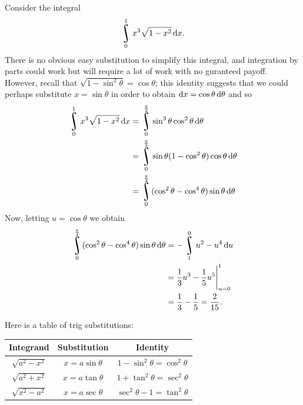 


Consider the integral
\begin{displaymath}
  \rint^1_0 x^3 \sqrt{1-x^2} \dif{x}.
\end{displaymath}
There is no obvious easy substitution to simplify this integral, and integration by parts could work but will require
a lot of work with no guranteed payoff. However, recall that $ \sqrt{1 - \sin^2 \theta} = \cos \theta $; this identity
suggests that we could perhaps substitute $ x = \sin \theta $ in order to obtain $ \dif{x} = \cos \theta \dif{\theta} $ and so
\begin{align*}
  \rint^1_0 x^3 \sqrt{1-x^2} \dif{x} &= \rint^{\frac{\pi}{2}}_0 \sin^3 \theta \cos^2 \theta \dif{\theta}\\
                                     &= \rint^{\frac{\pi}{2}}_0 \sin \theta (1-\cos^2 \theta)\cos \theta \dif{\theta}\\
                                     &= \rint^{\frac{\pi}{2}}_0 (\cos^2 \theta - \cos^4 \theta) \sin \theta \dif{\theta}
\end{align*}
Now, letting $ u = \cos \theta $ we obtain
\begin{align*}
  \rint^{\frac{\pi}{2}}_0 (\cos^2 \theta - \cos^4 \theta) \sin \theta \dif{\theta} &= -\rint^{0}_{1} u^2 - u^4 \dif{u}\\
                                                                                   &= \eval{\frac{1}{3}u^3 - \frac{1}{5}u^5}_{u = 0}^{1}\\
                                                                                   &= \frac{1}{3}-\frac{1}{5} = \frac{2}{15}.
\end{align*}

Here is a table of trig substitutions:

\begin{center}
  \def\arraystretch{1.5}
  \begin{tabular}{|c|c|c|}\hline
    \textbf{Integrand} & \textbf{Substitution} & \textbf{Identity}\\\hline
    $ \sqrt{a^2 - x^2} $ & $ x = a \sin \theta $ & $ 1 - \sin^2 \theta = \cos^2 \theta $\\\hline
    $ \sqrt{a^2 + x^2} $ & $ x = a \tan \theta $ & $ 1 + \tan^2 \theta = \sec^2 \theta $\\\hline
    $ \sqrt{x^2 - a^2} $ & $ x = a \sec \theta $ & $ \sec^2 \theta - 1 = \tan^2 \theta $\\\hline
  \end{tabular}
\end{center}

